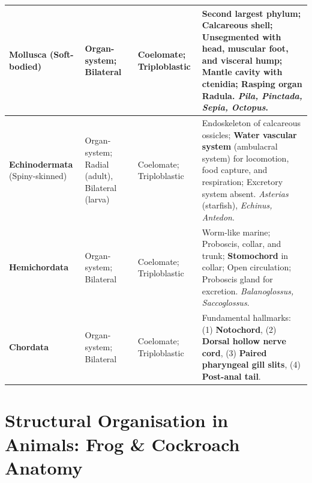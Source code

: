 \documentclass[10pt,a4paper]{article}
\begin{document}
\begin{conceptbox}
\begin{center}
\begin{tabular}{|p{2.3cm}|p{2.3cm}|p{2.6cm}|p{7.0cm}|}
\hline
\textbf{Mollusca} (Soft-bodied) & Organ-system; Bilateral & Coelomate; Triploblastic & \textbf{Second largest phylum}; Calcareous shell; Unsegmented with head, muscular foot, and visceral hump; Mantle cavity with ctenidia; Rasping organ \textbf{Radula}. \textit{Pila, Pinctada, Sepia, Octopus}. \\
\hline
\textbf{Echinodermata} (Spiny-skinned) & Organ-system; Radial (adult), Bilateral (larva) & Coelomate; Triploblastic & Endoskeleton of calcareous ossicles; \textbf{Water vascular system} (ambulacral system) for locomotion, food capture, and respiration; Excretory system absent. \textit{Asterias} (starfish), \textit{Echinus, Antedon}. \\
\hline
\textbf{Hemichordata} & Organ-system; Bilateral & Coelomate; Triploblastic & Worm-like marine; Proboscis, collar, and trunk; \textbf{Stomochord} in collar; Open circulation; Proboscis gland for excretion. \textit{Balanoglossus, Saccoglossus}. \\
\hline
\textbf{Chordata} & Organ-system; Bilateral & Coelomate; Triploblastic & Fundamental hallmarks: (1) \textbf{Notochord}, (2) \textbf{Dorsal hollow nerve cord}, (3) \textbf{Paired pharyngeal gill slits}, (4) \textbf{Post-anal tail}. \\
\hline
\end{tabular}
\end{center}
\end{conceptbox}

\section{Structural Organisation in Animals: Frog \& Cockroach Anatomy}
\end{document}
